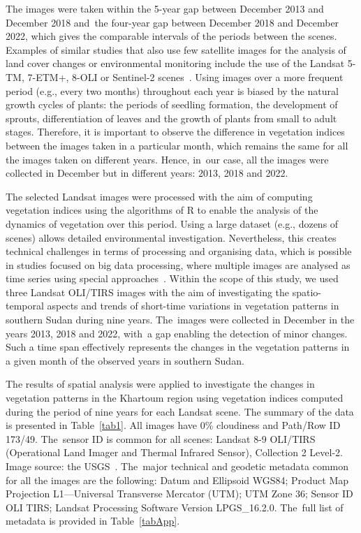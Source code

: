 \documentclass[jimaging,article,accept,pdftex,moreauthors]{Definitions/mdpi}
\begin{document}
The images were taken within the 5-year gap between December 2013 and December 2018 and~the four-year gap between December 2018 and December 2022, which gives the comparable intervals of the periods between the scenes. Examples of similar studies that also use few satellite images for the analysis of land cover changes or environmental monitoring include the use of the Landsat 5-TM, 7-ETM+, 8-OLI or Sentinel-2 scenes~\cite{Hammad_Mucsi,rs14246284,Talebi,essd2022339,Yilmaz,Nasseri}. Using images over a more frequent period (e.g., every two months) throughout each year is biased by the natural growth cycles of plants: the periods of seedling formation, the development of sprouts, differentiation of leaves and the growth of plants from small to adult stages. Therefore, it is important to observe the difference in vegetation indices between the images taken in a particular month, which remains the same for all the images taken on different years. Hence, in~our case, all the images were collected in December but in different years: 2013, 2018 and 2022.

The selected Landsat images were processed with the aim of computing vegetation indices using the algorithms of R to enable the analysis of the dynamics of vegetation over this period. Using a large dataset (e.g., dozens of scenes) allows detailed environmental investigation. Nevertheless, this creates technical challenges in terms of processing and organising data, which is possible in studies focused on big data processing, where multiple images are analysed as time series using special approaches~\cite{LiWangLu,Veretekhina,Gumma}. Within the scope of this study, we used three Landsat OLI/TIRS images with the aim of investigating the spatio-temporal aspects and trends of short-time variations in vegetation patterns in southern Sudan during nine years. The~images were collected in December in the years 2013, 2018 and 2022, with~a gap enabling the detection of minor changes. Such a time span effectively represents the changes in the vegetation patterns in a given month of the observed years in southern Sudan.

The results of spatial analysis were applied to investigate the changes in vegetation patterns in the Khartoum region using  vegetation indices computed during the period of nine years for each Landsat scene. The summary of the data is presented in Table~\ref{tab1}. All images have 0\% cloudiness and Path/Row ID 173/49. The~sensor ID is common for all scenes: Landsat 8-9 OLI/TIRS (Operational Land Imager and Thermal Infrared Sensor), Collection 2 Level-2. Image source: the USGS~\cite{EROS}. The~major technical and geodetic metadata common for all the images are the following: Datum and Ellipsoid WGS84; Product Map Projection L1---Universal Transverse Mercator (UTM); UTM Zone 36; Sensor ID OLI TIRS; Landsat Processing Software Version LPGS\_16.2.0. The~full list of metadata is provided in Table~\ref{tabApp}.
\end{document}
